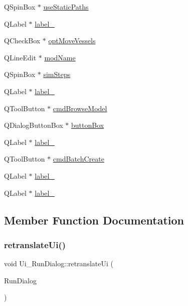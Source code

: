 \begin{DoxyCompactItemize}
Q\+Spin\+Box $\ast$ \mbox{\hyperlink{class_ui___run_dialog_a7958c3fb469fe573f9bcf73430beb0b3}{use\+Static\+Paths}}
\item 
Q\+Label $\ast$ \mbox{\hyperlink{class_ui___run_dialog_a4f11a3335dde15ed0032d93534ad5b15}{label\+\_}}
\item 
Q\+Check\+Box $\ast$ \mbox{\hyperlink{class_ui___run_dialog_abc2da86a9619a3c61d2ccd7fdffa6392}{opt\+Move\+Vessels}}
\item 
Q\+Line\+Edit $\ast$ \mbox{\hyperlink{class_ui___run_dialog_a8d0031febd18e784d133bba7027b5cd4}{mod\+Name}}
\item 
Q\+Spin\+Box $\ast$ \mbox{\hyperlink{class_ui___run_dialog_a3e629b14f39b020f3c505c59c74a9358}{sim\+Steps}}
\item 
Q\+Label $\ast$ \mbox{\hyperlink{class_ui___run_dialog_acfe7b833ae06219b3c8b0a6e2ec566a2}{label\+\_}}
\item 
Q\+Tool\+Button $\ast$ \mbox{\hyperlink{class_ui___run_dialog_a915a0f8a83a27151e218df85a098e5e6}{cmd\+Browse\+Model}}
\item 
Q\+Dialog\+Button\+Box $\ast$ \mbox{\hyperlink{class_ui___run_dialog_a48c4abf7042b33f5107cb51da3b8ec46}{button\+Box}}
\item 
Q\+Label $\ast$ \mbox{\hyperlink{class_ui___run_dialog_a43636d8f770691d8219f809f6bf70eb4}{label\+\_}}
\item 
Q\+Tool\+Button $\ast$ \mbox{\hyperlink{class_ui___run_dialog_a8f020a8ebf0002a520466553df355360}{cmd\+Batch\+Create}}
\item 
Q\+Label $\ast$ \mbox{\hyperlink{class_ui___run_dialog_ad5ab11a18a7296b7bcf042d31ae7e3b3}{label\+\_}}
\item 
Q\+Label $\ast$ \mbox{\hyperlink{class_ui___run_dialog_a7799c61eda108e0d688be7e3f8c13f20}{label\+\_}}
\end{DoxyCompactItemize}


\subsection{Member Function Documentation}
\mbox{\label{class_ui___run_dialog_abcad95b8ac18d97a7331334555654930}} 
\subsubsection{\texorpdfstring{retranslateUi()}{retranslateUi()}}
{\footnotesize\ttfamily void Ui\+\_\+\+Run\+Dialog\+::retranslate\+Ui (\begin{DoxyParamCaption}\item[{Q\+Dialog $\ast$}]{Run\+Dialog }\end{DoxyParamCaption})\hspace{0.3cm}{\ttfamily [inline]}}

